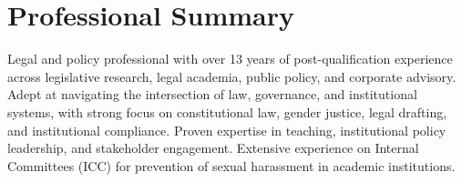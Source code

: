 \section{Professional Summary}
Legal and policy professional with over 13 years of post-qualification experience across legislative research, legal academia, public policy, and corporate advisory. Adept at navigating the intersection of law, governance, and institutional systems, with strong focus on constitutional law, gender justice, legal drafting, and institutional compliance. Proven expertise in teaching, institutional policy leadership, and stakeholder engagement. Extensive experience on Internal Committees (ICC) for prevention of sexual harassment in academic institutions.
